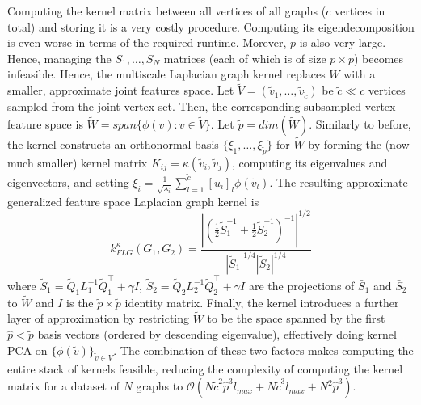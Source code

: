 \documentclass[twoside,11pt]{article}
\begin{document}
Computing the kernel matrix between all vertices of all graphs ($c$ vertices in total) and storing it is a very costly procedure.
Computing its eigendecomposition is even worse in terms of the required runtime.
Morever, $p$ is also very large.
Hence, managing the $\bar{S}_1, \ldots, \bar{S}_N$ matrices (each of which is of size $p \times p$) becomes infeasible.
Hence, the multiscale Laplacian graph kernel replaces $W$ with a smaller, approximate joint features space.
Let $\tilde{V} = (\tilde{v}_1, \ldots, \tilde{v}_{\tilde{c}})$ be $\tilde{c} \ll c$ vertices sampled from the joint vertex set.
Then, the corresponding subsampled vertex feature space is $\tilde{W} = span \{ \phi(v) : v \in \tilde{V} \}$.
Let $\tilde{p} = dim(\tilde{W})$.
Similarly to before, the kernel constructs an orthonormal basis $\{ \xi_1, \ldots, \xi_{\tilde{p}} \}$ for $\tilde{W}$ by forming the (now much smaller) kernel matrix $K_{ij} = \kappa(\tilde{v}_i, \tilde{v}_j)$, computing its eigenvalues and eigenvectors, and setting $\xi_i = \frac{1}{\sqrt{\lambda_i}} \sum_{l=1}^{\tilde{c}} [u_i]_l \phi(\tilde{v}_l)$. 
The resulting approximate generalized feature space Laplacian graph kernel is
\begin{equation}
    k_{FLG}^\kappa(G_1, G_2) = \frac{| (\frac{1}{2} \tilde{S}_1^{-1} + \frac{1}{2} \tilde{S}_2^{-1} )^{-1} |^{1/2}}{|\tilde{S}_1|^{1/4} |\tilde{S}_2|^{1/4}} 
\end{equation}
where $\tilde{S}_1 = \tilde{Q}_1 L_1^{-1} \tilde{Q}_1^\top + \gamma I$, $\tilde{S}_2 = \tilde{Q}_2 L_2^{-1} \tilde{Q}_2^\top + \gamma I$ are the projections of $\bar{S}_1$ and $\bar{S}_2$ to $\tilde{W}$ and $I$ is the $\tilde{p} \times \tilde{p}$ identity matrix.
Finally, the kernel introduces a further layer of approximation by restricting $\tilde{W}$ to be the space spanned by the first $\hat{p} < \tilde{p}$ basis vectors (ordered by descending eigenvalue), effectively doing kernel PCA on $\{ \phi(\tilde{v}) \}_{\tilde{v} \in \tilde{V}}$.
The combination of these two factors makes computing the entire stack of kernels feasible, reducing the complexity of computing the kernel matrix for a dataset of $N$ graphs to $\mathcal{O}(N \tilde{c}^2 \hat{p}^3 l_{max} + N \tilde{c}^3 l_{max} + N^2 \hat{p}^3)$.
\end{document}

